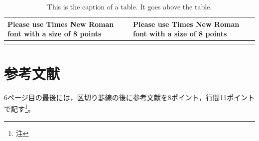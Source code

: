 \documentclass[base=10pt,magstyle=real,a4paper,twocolumn,xelatex,pandoc,jafont=ms]{bxjsarticle}%
\begin{document}
\begin{table}[H]
	\caption{This is the caption of a table. It goes above the table.}
	\label{tab:joho}
	\small
	\centering
	\begin{tabular}{l|l}
		\hline 
		Please use Times New Roman font with a size of 8 points
		& Please use Times New Roman font with a size of 8 points
		\\ 
		\hline \hline
		 & \\
		\hline 
	\end{tabular} 
\end{table}


\section{参考文献}
6ページ目の最後には，区切り罫線の後に参考文献を8ポイント，行間11ポイントで記す\footnote{注}。
\end{document}

